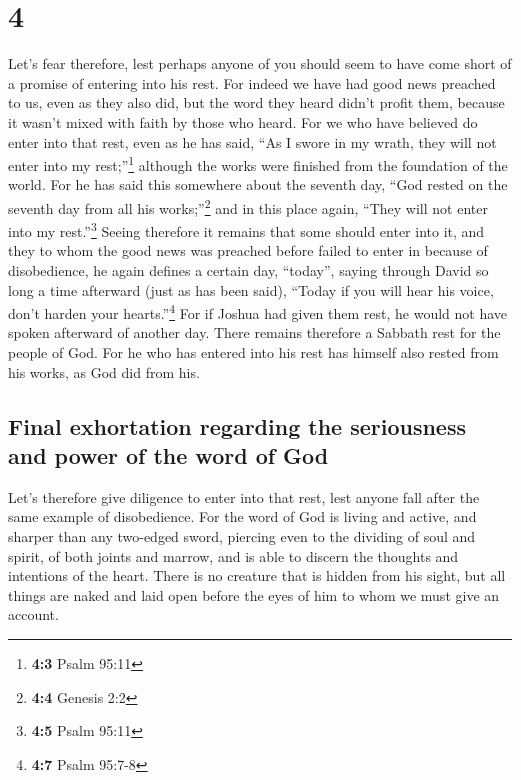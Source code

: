 \hypertarget{section-3}{%
\section{4}\label{section-3}}

 Let's fear therefore, lest perhaps anyone of you should
seem to have come short of a promise of entering into his rest.
 For indeed we have had good news preached to us, even as
they also did, but the word they heard didn't profit them, because it
wasn't mixed with faith by those who heard.  For we who
have believed do enter into that rest, even as he has said, ``As I swore
in my wrath, they will not enter into my rest;''\footnote{\textbf{4:3}
  Psalm 95:11} although the works were finished from the foundation of
the world.  For he has said this somewhere about the
seventh day, ``God rested on the seventh day from all his
works;''\footnote{\textbf{4:4} Genesis 2:2}  and in this
place again, ``They will not enter into my rest.''\footnote{\textbf{4:5}
  Psalm 95:11}  Seeing therefore it remains that some
should enter into it, and they to whom the good news was preached before
failed to enter in because of disobedience,  he again
defines a certain day, ``today'', saying through David so long a time
afterward (just as has been said), ``Today if you will hear his voice,
don't harden your hearts.''\footnote{\textbf{4:7} Psalm 95:7-8}
 For if Joshua had given them rest, he would not have
spoken afterward of another day.  There remains therefore
a Sabbath rest for the people of God.  For he who has
entered into his rest has himself also rested from his works, as God did
from his.

\hypertarget{final-exhortation-regarding-the-seriousness-and-power-of-the-word-of-god}{%
\subsection{Final exhortation regarding the seriousness and power of the
word of
God}\label{final-exhortation-regarding-the-seriousness-and-power-of-the-word-of-god}}

 Let's therefore give diligence to enter into that rest,
lest anyone fall after the same example of disobedience. 
For the word of God is living and active, and sharper than any two-edged
sword, piercing even to the dividing of soul and spirit, of both joints
and marrow, and is able to discern the thoughts and intentions of the
heart.  There is no creature that is hidden from his
sight, but all things are naked and laid open before the eyes of him to
whom we must give an account.


